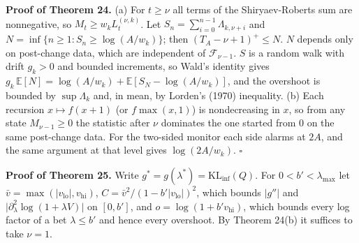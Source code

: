 \documentclass[
]{article}
\begin{document}
\textbf{Proof of Theorem 24.} (a) For \(t \ge \nu\) all terms of the
Shiryaev-Roberts sum are nonnegative, so \(M_t \ge w_k L_t^{(\nu, k)}\).
Let \(S_n = \sum_{i=0}^{n-1} \Lambda_{k, \nu+i}\) and
\(N = \inf\lbrace n \ge 1 : S_n \ge \log(A/w_k)\rbrace\); then
\((T_A - \nu + 1)^+ \le N\). \(N\) depends only on post-change data,
which are independent of \(\mathcal{F}_{\nu-1}\). \(S\) is a random walk
with drift \(g_k > 0\) and bounded increments, so Wald's identity gives
\(g_k\,\mathbb{E}[N] = \log(A/w_k) + \mathbb{E}[S_N - \log(A/w_k)]\),
and the overshoot is bounded by \(\sup \Lambda_k\) and, in mean, by
Lorden's (1970) inequality. (b) Each recursion \(x \mapsto f(x + 1)\)
(or \(f\max(x, 1)\)) is nondecreasing in \(x\), so from any state
\(M_{\nu-1} \ge 0\) the statistic after \(\nu\) dominates the one
started from 0 on the same post-change data. For the two-sided monitor
each side alarms at \(2A\), and the same argument at that level gives
\(\log(2A/w_k)\). \(\square\)

\textbf{Proof of Theorem 25.} Write
\(g^\ast = g(\lambda^\ast) = \mathrm{KL}_{\inf}(Q)\). For
\(0 < b' < \lambda_{\max}\) let
\(\bar v = \max(\lvert v_{\mathrm{lo}}\rvert, v_{\mathrm{hi}})\),
\(C = \bar v^2/(1 - b'\lvert v_{\mathrm{lo}}\rvert)^2\), which bounds
\(\lvert g''\rvert\) and
\(\lvert \partial_\lambda^2 \log(1 + \lambda V)\rvert\) on \([0, b']\),
and \(o = \log(1 + b' v_{\mathrm{hi}})\), which bounds every log factor
of a bet \(\lambda \le b'\) and hence every overshoot. By Theorem 24(b)
it suffices to take \(\nu = 1\).
\end{document}
